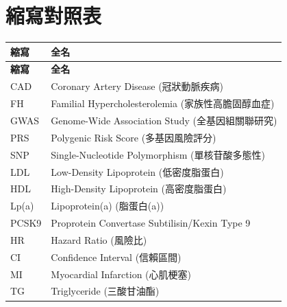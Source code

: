 \documentclass[12pt,a4paper]{article}
\begin{document}
\section{縮寫對照表}

\begin{longtable}{p{4cm}p{10cm}}
\toprule
\textbf{縮寫} & \textbf{全名} \\
\midrule
\endfirsthead

\toprule
\textbf{縮寫} & \textbf{全名} \\
\midrule
\endhead

\bottomrule
\endfoot

CAD & Coronary Artery Disease (冠狀動脈疾病) \\
FH & Familial Hypercholesterolemia (家族性高膽固醇血症) \\
GWAS & Genome-Wide Association Study (全基因組關聯研究) \\
PRS & Polygenic Risk Score (多基因風險評分) \\
SNP & Single-Nucleotide Polymorphism (單核苷酸多態性) \\
LDL & Low-Density Lipoprotein (低密度脂蛋白) \\
HDL & High-Density Lipoprotein (高密度脂蛋白) \\
Lp(a) & Lipoprotein(a) (脂蛋白(a)) \\
PCSK9 & Proprotein Convertase Subtilisin/Kexin Type 9 \\
HR & Hazard Ratio (風險比) \\
CI & Confidence Interval (信賴區間) \\
MI & Myocardial Infarction (心肌梗塞) \\
TG & Triglyceride (三酸甘油酯) \\
\bottomrule
\end{longtable}
\end{document}
